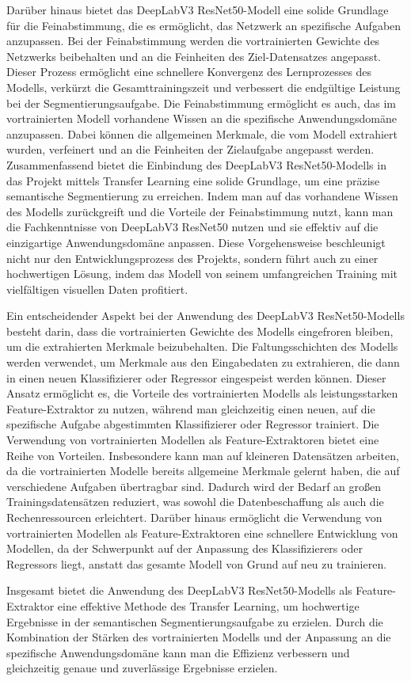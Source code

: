    Darüber hinaus bietet das DeepLabV3 ResNet50-Modell eine solide Grundlage für die Feinabstimmung, die es ermöglicht, das Netzwerk an spezifische Aufgaben anzupassen.
    Bei der Feinabstimmung werden die vortrainierten Gewichte des Netzwerks beibehalten und an die Feinheiten des Ziel-Datensatzes angepasst.
    Dieser Prozess ermöglicht eine schnellere Konvergenz des Lernprozesses des Modells, verkürzt die Gesamttrainingszeit und verbessert die endgültige Leistung bei der Segmentierungsaufgabe.
    Die Feinabstimmung ermöglicht es auch, das im vortrainierten Modell vorhandene Wissen an die spezifische Anwendungsdomäne anzupassen.
    Dabei können die allgemeinen Merkmale, die vom Modell extrahiert wurden, verfeinert und an die Feinheiten der Zielaufgabe angepasst werden.
    Zusammenfassend bietet die Einbindung des DeepLabV3 ResNet50-Modells in das Projekt mittels Transfer Learning eine solide Grundlage, um eine präzise semantische Segmentierung zu erreichen. 
    Indem man auf das vorhandene Wissen des Modells zurückgreift und die Vorteile der Feinabstimmung nutzt, kann man die Fachkenntnisse von DeepLabV3 ResNet50 nutzen und sie effektiv auf die einzigartige Anwendungsdomäne anpassen. 
    Diese Vorgehensweise beschleunigt nicht nur den Entwicklungsprozess des Projekts, sondern führt auch zu einer hochwertigen Lösung, indem das Modell von seinem umfangreichen Training mit vielfältigen visuellen Daten profitiert.
    
    Ein entscheidender Aspekt bei der Anwendung des DeepLabV3 ResNet50-Modells besteht darin, dass die vortrainierten Gewichte des Modells eingefroren bleiben, um die extrahierten Merkmale beizubehalten. 
    Die Faltungsschichten des Modells werden verwendet, um Merkmale aus den Eingabedaten zu extrahieren, die dann in einen neuen Klassifizierer oder Regressor eingespeist werden können. 
    Dieser Ansatz ermöglicht es, die Vorteile des vortrainierten Modells als leistungsstarken Feature-Extraktor zu nutzen, während man gleichzeitig einen neuen, auf die spezifische Aufgabe abgestimmten Klassifizierer oder Regressor trainiert.
    Die Verwendung von vortrainierten Modellen als Feature-Extraktoren bietet eine Reihe von Vorteilen. Insbesondere kann man auf kleineren Datensätzen arbeiten, da die vortrainierten Modelle bereits allgemeine Merkmale gelernt haben, die auf verschiedene Aufgaben übertragbar sind. 
    Dadurch wird der Bedarf an großen Trainingsdatensätzen reduziert, was sowohl die Datenbeschaffung als auch die Rechenressourcen erleichtert. 
    Darüber hinaus ermöglicht die Verwendung von vortrainierten Modellen als Feature-Extraktoren eine schnellere Entwicklung von Modellen, da der Schwerpunkt auf der Anpassung des Klassifizierers oder Regressors liegt, anstatt das gesamte Modell von Grund auf neu zu trainieren.
    
    Insgesamt bietet die Anwendung des DeepLabV3 ResNet50-Modells als Feature-Extraktor eine effektive Methode des Transfer Learning, um hochwertige Ergebnisse in der semantischen Segmentierungsaufgabe zu erzielen. 
    Durch die Kombination der Stärken des vortrainierten Modells und der Anpassung an die spezifische Anwendungsdomäne kann man die Effizienz verbessern und gleichzeitig genaue und zuverlässige Ergebnisse erzielen.